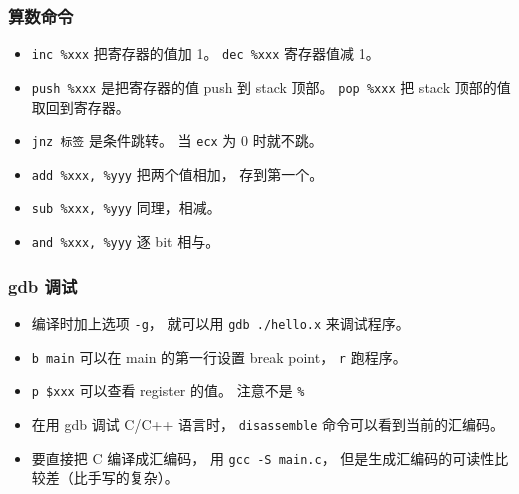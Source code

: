 \subsubsection{算数命令}
\begin{itemize}
\item \verb|inc %xxx| 把寄存器的值加 1。 \verb|dec %xxx| 寄存器值减 1。
\item \verb|push %xxx| 是把寄存器的值 push 到 stack 顶部。 \verb|pop %xxx| 把 stack 顶部的值取回到寄存器。
\item \verb|jnz 标签| 是条件跳转。 当 \verb|ecx| 为 0 时就不跳。
\item \verb|add %xxx, %yyy| 把两个值相加， 存到第一个。
\item \verb|sub %xxx, %yyy| 同理，相减。
\item \verb|and %xxx, %yyy| 逐 bit 相与。
\end{itemize}

\subsubsection{gdb 调试}
\begin{itemize}
\item 编译时加上选项 \verb|-g|， 就可以用 \verb|gdb ./hello.x| 来调试程序。
\item \verb|b main| 可以在 main 的第一行设置 break point， \verb|r| 跑程序。
\item \verb|p $xxx| 可以查看 register 的值。 注意不是 \verb|%|
\item 在用 gdb 调试 C/C++ 语言时， \verb|disassemble| 命令可以看到当前的汇编码。
\item 要直接把 C 编译成汇编码， 用 \verb|gcc -S main.c|， 但是生成汇编码的可读性比较差（比手写的复杂）。
\end{itemize}

